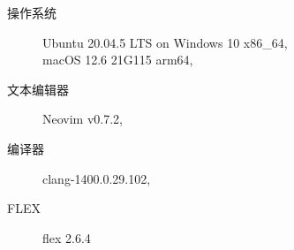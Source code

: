 \begin{description}
	\item[操作系统] Ubuntu 20.04.5 LTS on Windows 10 x86\_64, \\
		macOS 12.6 21G115 arm64,
	\item[文本编辑器] Neovim v0.7.2,
	\item[编译器] clang-1400.0.29.102,
	\item[FLEX] flex 2.6.4
\end{description}
